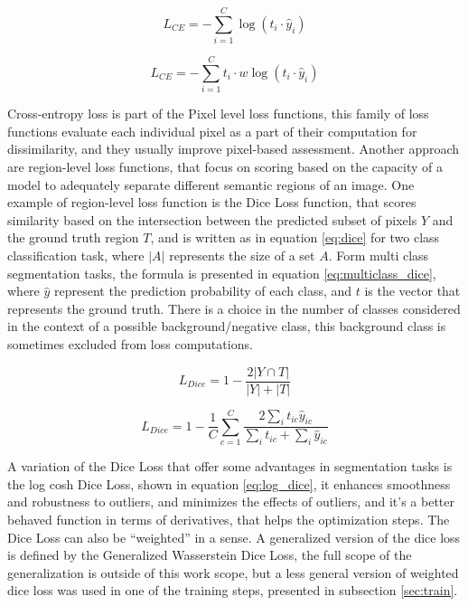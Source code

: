 \documentclass[10pt, conference]{IEEEtran}
\begin{document}
\begin{equation}
  L_{CE} = -\sum_{i=1}^{C} \log(t_i \cdot \hat{y}_i)
  \label{eq:cross_entropy}
\end{equation}


\begin{equation}
  L_{CE} = -\sum_{i=1}^{C} t_i \cdot w \log(t_i \cdot \hat{y}_i)
  \label{eq:weighted_cross_entropy}
\end{equation}

Cross-entropy loss is part of the Pixel level loss functions, this family of loss functions
evaluate each individual pixel as a part of their computation for dissimilarity, and they usually
improve pixel-based assessment. Another approach are region-level loss functions, that focus
on scoring based on the capacity of  a model to adequately separate different semantic regions of
an image. One example of region-level loss function is the Dice Loss function, that scores
similarity based on the intersection between the predicted subset of pixels $Y$ and the ground
truth region $T$, and is written as in equation \ref{eq:dice} for two class classification task, where
$|A|$ represents the size of a set $A$.
Form multi class segmentation tasks, the formula is presented in equation \ref{eq:multiclass_dice},
where $\hat{y}$ represent the prediction probability of each class, and $t$ is the vector that
represents the ground truth. There is a choice in the number of classes considered in the context
of a possible background/negative class, this background class is sometimes excluded from loss computations.

\begin{equation}
  L_{Dice} = 1 - \frac{2 |Y \cap T|}{|Y| + |T|}
  \label{eq:dice}
\end{equation}


\begin{equation}
  L_{Dice} = 1 - \frac{1}{C} \sum_{c=1}^{C} \frac{2 \sum_{i} t_{ic} \hat{y}_{ic}}{\sum_{i} t_{ic} + \sum_{i} \hat{y}_{ic}}
  \label{eq:multiclass_dice}
\end{equation}

A variation of the Dice Loss that offer some advantages in segmentation tasks is the
log cosh Dice Loss, shown in equation \ref{eq:log_dice}, it enhances smoothness and robustness to outliers,
and minimizes the effects of outliers, and it's a better behaved function in terms of derivatives, that helps
the optimization steps. The Dice Loss can also be ``weighted'' in a sense. A generalized version
of the dice loss is defined by the Generalized Wasserstein Dice Loss, the full scope of the
generalization is outside of this work scope, but a less general version of weighted dice loss
was used in one of the training steps, presented in subsection \ref{sec:train}.
\end{document}
